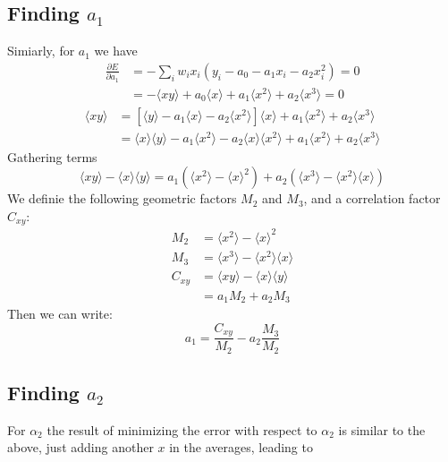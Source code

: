 \documentclass[oneside]{tufte-handout}
\begin{document}
\begin{fullwidth}
\subsection{Finding $a_1$}
Simiarly, for $a_1$ we have
\begin{align*}
\frac{\partial E}{\partial a_1} &= - \sum_i w_i x_i (y_i - a_0 - a_1 x_i - a_2 x_i^2) = 0 \\
                                &= - \langle x y \rangle + a_0 \langle x \rangle + a_1 \langle x^2 \rangle + a_2 \langle x^3 \rangle = 0
\end{align*}
\begin{align*}
\langle x y \rangle &= \left[\langle y \rangle - a_1 \langle x \rangle - a_2 \langle x^2 \rangle \right] \langle x \rangle + a_1 \langle x^2 \rangle + a_2 \langle x^3 \rangle \\
                    &= \langle x \rangle \langle y \rangle - a_1 \langle x^2 \rangle - a_2 \langle x \rangle \langle x^2 \rangle + a_1 \langle x^2 \rangle + a_2 \langle x^3 \rangle
\end{align*}
Gathering terms
\begin{equation*}
\langle x y \rangle - \langle x \rangle \langle y \rangle = a_1 (\langle x^2 \rangle - \langle x \rangle^2) + a_2 (\langle x^3 \rangle - \langle x^2 \rangle \langle x \rangle)
\end{equation*}
We definie the following geometric factors $M_2$ and $M_3$, and a correlation factor $C_{xy}$:
\begin{align*}
M_2 &= \langle x^2 \rangle - \langle x \rangle^2 \\
M_3 &= \langle x^3 \rangle - \langle x^2 \rangle \langle x \rangle \\
C_{xy} &= \langle x y \rangle - \langle x \rangle \langle y \rangle \\
       &= a_1 M_2 + a_2 M_3
\end{align*}
Then we can write:
\begin{equation*}
a_1 = \frac{C_{xy}}{M_2} - a_2 \frac{M_3}{M_2}
\end{equation*}

\subsection{Finding $a_2$}

For $\alpha_2$ the result of minimizing the error with respect to $\alpha_2$ is similar to the above, just adding another $x$ in the averages, leading to


\end{fullwidth}
\end{document}
